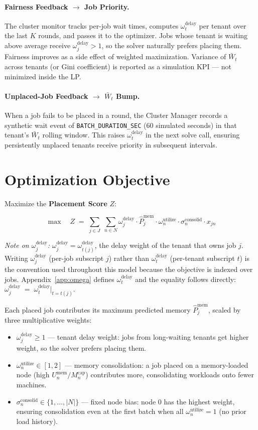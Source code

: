 \documentclass[11pt]{article}
\newcommand{\Mcap}{M_n^{\text{cap}}}
\newcommand{\sigconsolid}{\sigma_n^{\text{consolid}}}
\newcommand{\omutilize}{\omega_n^{\text{utilize}}}
\newcommand{\Umem}{U_n^{\text{mem}}}
\newcommand{\omdelay}{\omega_j^{\text{delay}}}
\newcommand{\omdelayt}{\omega_t^{\text{delay}}}
\newcommand{\Pmem}{\hat{P}_j^{\text{mem}}}
\begin{document}
\paragraph{Fairness Feedback $\rightarrow$ Job Priority.}
The cluster monitor tracks per-job wait times, computes $\omdelayt$ per tenant
over the last $K$ rounds, and passes it to the optimizer. Jobs whose tenant is
waiting above average receive $\omdelay > 1$, so the solver naturally prefers
placing them. Fairness improves as a side effect of weighted maximization.
Variance of $\bar{W}_t$ across tenants (or Gini coefficient) is reported as a
simulation KPI --- not minimized inside the LP.

\paragraph{Unplaced-Job Feedback $\rightarrow$ $\bar{W}_t$ Bump.}
When a job fails to be placed in a round, the Cluster Manager records a synthetic
wait event of \texttt{BATCH\_DURATION\_SEC} (60 simulated seconds) in that
tenant's $\bar{W}_t$ rolling window. This raises $\omdelayt$ in the next solve
call, ensuring persistently unplaced tenants receive priority in subsequent
intervals.

\section{Optimization Objective}

Maximize the \textbf{Placement Score} $Z$:

\[
  \max \quad Z \;=\;
  \sum_{j \in J}\; \sum_{n \in N}
    \omdelay \cdot \Pmem \cdot \omutilize \cdot \sigconsolid \cdot x_{jn}
\]

\noindent\textit{Note on $\omdelay$:} $\omdelay = \omega_{t(j)}^{\text{delay}}$,
the delay weight of the tenant that owns job $j$. Writing $\omdelay$ (per-job
subscript $j$) rather than $\omdelayt$ (per-tenant subscript $t$) is the
convention used throughout this model because the objective is indexed over
jobs. Appendix~\ref{app:omega} defines $\omdelayt$ and the equality follows
directly: $\omdelay \;=\; \omdelayt\big|_{t=t(j)}$.

\medskip
Each placed job contributes its maximum predicted memory $\Pmem$, scaled by
three multiplicative weights:
\begin{itemize}[noitemsep, topsep=4pt]
  \item $\omdelay \geq 1$ --- tenant delay weight: jobs from long-waiting
    tenants get higher weight, so the solver prefers placing them.
  \item $\omutilize \in [1,2]$ --- memory consolidation: a job placed on a
    memory-loaded node (high $\Umem / \Mcap$) contributes more, consolidating
    workloads onto fewer machines.
  \item $\sigconsolid \in \{1,\ldots,|N|\}$ --- fixed node bias: node 0 has the
    highest weight, ensuring consolidation even at the first batch when all
    $\omutilize = 1$ (no prior load history).
\end{itemize}
\end{document}
